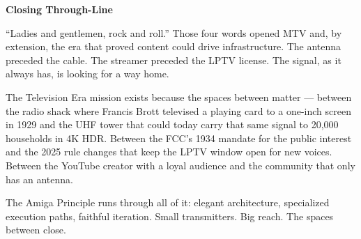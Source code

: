 \documentclass[11pt,letterpaper]{article}
\begin{document}
\begin{quotebox}
\textbf{Closing Through-Line}

``Ladies and gentlemen, rock and roll.'' Those four words opened MTV and, by extension, the era that proved content could drive infrastructure. The antenna preceded the cable. The streamer preceded the LPTV license. The signal, as it always has, is looking for a way home.

The Television Era mission exists because the spaces between matter --- between the radio shack where Francis Brott televised a playing card to a one-inch screen in 1929 and the UHF tower that could today carry that same signal to 20,000 households in 4K HDR. Between the FCC's 1934 mandate for the public interest and the 2025 rule changes that keep the LPTV window open for new voices. Between the YouTube creator with a loyal audience and the community that only has an antenna.

The Amiga Principle runs through all of it: elegant architecture, specialized execution paths, faithful iteration. Small transmitters. Big reach. The spaces between close.
\end{quotebox}
\end{document}
